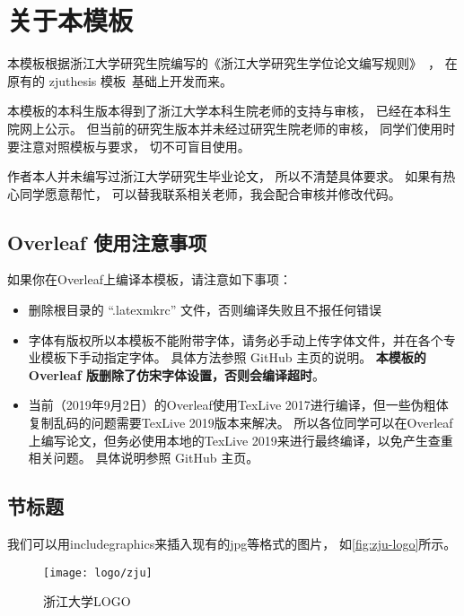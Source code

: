 \chapter{关于本模板}

本模板根据浙江大学研究生院编写的《浙江大学研究生学位论文编写规则》~\cite{zjugradthesisrules}，
在原有的 zjuthesis 模板~\cite{zjuthesis}基础上开发而来。

本模板的本科生版本\cite{zjuthesisrules}得到了浙江大学本科生院老师的支持与审核，
已经在本科生院网上公示。
但当前的研究生版本并未经过研究生院老师的审核，
同学们使用时要注意对照模板与要求，
切不可盲目使用。

作者本人并未编写过浙江大学研究生毕业论文，
所以不清楚具体要求。
如果有热心同学愿意帮忙，
可以替我联系相关老师，我会配合审核并修改代码。

\section{Overleaf 使用注意事项}

如果你在Overleaf上编译本模板，请注意如下事项：

\begin{itemize}
    \item 删除根目录的 ``.latexmkrc'' 文件，否则编译失败且不报任何错误
    \item 字体有版权所以本模板不能附带字体，请务必手动上传字体文件，并在各个专业模板下手动指定字体。
        具体方法参照 GitHub 主页的说明。
        {\bfseries 本模板的 Overleaf 版删除了仿宋字体设置，否则会编译超时}。
    \item 当前（2019年9月2日）的Overleaf使用TexLive 2017进行编译，但一些伪粗体复制乱码的问题需要TexLive 2019版本来解决。
        所以各位同学可以在Overleaf上编写论文，但务必使用本地的TexLive 2019来进行最终编译，以免产生查重相关问题。
        具体说明参照 GitHub 主页。
\end{itemize}


\section{节标题}

我们可以用includegraphics来插入现有的jpg等格式的图片，
如\autoref{fig:zju-logo}所示。

\begin{figure}[htbp]
    \centering
    \texttt{[image: logo/zju]}
    \caption{\label{fig:zju-logo}浙江大学LOGO}
\end{figure}


